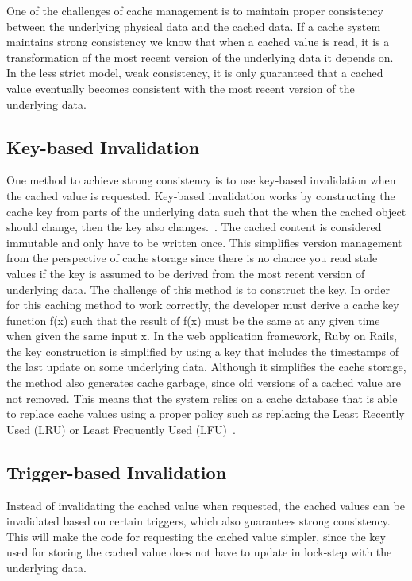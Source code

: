 One of the challenges of cache management is to maintain proper consistency between the underlying physical data and the cached data. If a cache system maintains strong consistency we know that when a cached value is read, it is a transformation of the most recent version of the underlying data it depends on. In the less strict model, weak consistency, it is only guaranteed that a cached value eventually becomes consistent with the most recent version of the underlying data.

\subsection{Key-based Invalidation}

One method to achieve strong consistency is to use key-based invalidation when the cached value is requested. Key-based invalidation works by constructing the cache key from parts of the underlying data such that the when the cached object should change, then the key also changes.~\cite{blog:key_based_invalidation}. The cached content is considered immutable and only have to be written once. This simplifies version management from the perspective of cache storage since there is no chance you read stale values if the key is assumed to be derived from the most recent version of underlying data. The challenge of this method is to construct the key. In order for this caching method to work correctly, the developer must derive a cache key function f(x) such that the result of f(x) must be the same at any given time when given the same input x. In the web application framework, Ruby on Rails, the key construction is simplified by using a key that includes the timestamps of the last update on some underlying data. Although it simplifies the cache storage, the method also generates cache garbage, since old versions of a cached value are not removed. This means that the system relies on a cache database that is able to replace cache values using a proper policy such as replacing the Least Recently Used (LRU) or Least Frequently Used (LFU)~\cite{paper:paper:web_caching_schemes}.

\subsection{Trigger-based Invalidation}

Instead of invalidating the cached value when requested, the cached values can be invalidated based on certain triggers, which also guarantees strong consistency. This will make the code for requesting the cached value simpler, since the key used for storing the cached value does not have to update in lock-step with the underlying data.

